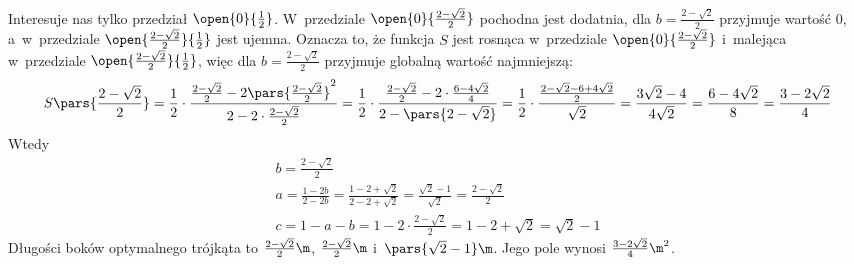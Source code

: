 Interesuje nas tylko przedział \(\open{0}{\frac{1}{2}}\). W~przedziale \(\open{0}{\frac{2 - \sqrt{2}}{2}}\) pochodna jest dodatnia, dla \(b = \frac{2 - \sqrt{2}}{2}\) przyjmuje wartość \(0\), a~w~przedziale \(\open{\frac{2 - \sqrt{2}}{2}}{\frac{1}{2}}\) jest ujemna. Oznacza to, że funkcja \(S\) jest rosnąca w~przedziale \(\open{0}{\frac{2 - \sqrt{2}}{2}}\) i~malejąca w~przedziale \(\open{\frac{2 - \sqrt{2}}{2}}{\frac{1}{2}}\), więc dla \(b = \frac{2 - \sqrt{2}}{2}\) przyjmuje globalną wartość najmniejszą:
\begin{equation*}
    S\pars{\frac{2 - \sqrt{2}}{2}}
        = \frac{1}{2} \cdot \frac{\frac{2 - \sqrt{2}}{2} - 2\pars{\frac{2 - \sqrt{2}}{2}}^2}{2 - 2 \cdot \frac{2 - \sqrt{2}}{2}}
        = \frac{1}{2} \cdot \frac{\frac{2 - \sqrt{2}}{2} - 2 \cdot \frac{6 - 4\sqrt{2}}{4}}{2 - \pars{2 - \sqrt{2}}}
        = \frac{1}{2} \cdot \frac{\frac{2 - \sqrt{2} - 6 + 4\sqrt{2}}{2}}{\sqrt{2}}
        = \frac{3\sqrt{2} - 4}{4\sqrt{2}}
        = \frac{6 - 4\sqrt{2}}{8}
        = \frac{3 - 2\sqrt{2}}{4}
\end{equation*}
Wtedy
\begin{gather*}
    b = \frac{2 - \sqrt{2}}{2}\\
    a
        = \frac{1 - 2b}{2 - 2b}
        = \frac{1 - 2 + \sqrt{2}}{2 - 2 + \sqrt{2}}
        = \frac{\sqrt{2} - 1}{\sqrt{2}}
        = \frac{2 - \sqrt{2}}{2}\\
    c
        = 1 - a - b
        = 1 - 2 \cdot \frac{2 - \sqrt{2}}{2}
        = 1 - 2 + \sqrt{2}
        = \sqrt{2} - 1
\end{gather*}
Długości boków optymalnego trójkąta to \(\frac{2 - \sqrt{2}}{2}\m\), \(\frac{2 - \sqrt{2}}{2}\m\) i~\(\pars{\sqrt{2} - 1}\m\). Jego pole wynosi \(\frac{3 - 2\sqrt{2}}{4}\m^2\).
